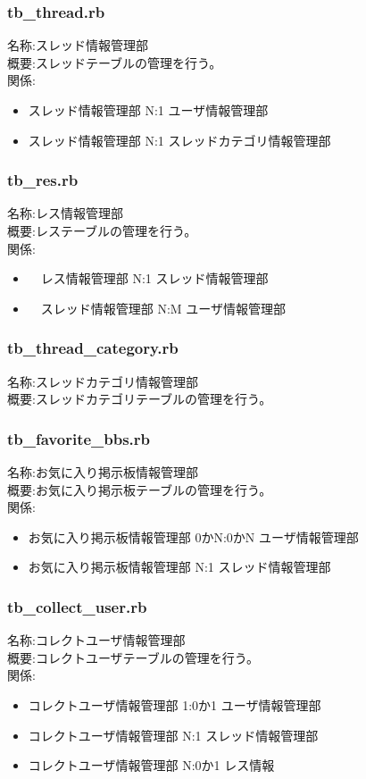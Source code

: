 \documentclass[a4j]{jarticle}
\begin{document}
\subsubsection{tb\_thread.rb}
  \noindent
  名称:スレッド情報管理部\\
  概要:スレッドテーブルの管理を行う。\\
  関係:
  \begin{itemize}
  \item スレッド情報管理部 N:1 ユーザ情報管理部
  \item スレッド情報管理部 N:1 スレッドカテゴリ情報管理部
  \end{itemize}

\subsubsection{tb\_res.rb}
  \noindent
  名称:レス情報管理部\\
  概要:レステーブルの管理を行う。\\
  関係:

  \begin{itemize}
  \item　レス情報管理部 N:1 スレッド情報管理部
  \item　スレッド情報管理部 N:M ユーザ情報管理部
  \end{itemize}

\subsubsection{tb\_thread\_category.rb}
  \noindent
  名称:スレッドカテゴリ情報管理部\\
  概要:スレッドカテゴリテーブルの管理を行う。\\

\subsubsection{tb\_favorite\_bbs.rb}
  \noindent
  名称:お気に入り掲示板情報管理部\\
  概要:お気に入り掲示板テーブルの管理を行う。\\
  関係:
  \begin{itemize}
  \item お気に入り掲示板情報管理部 0かN:0かN ユーザ情報管理部
  \item お気に入り掲示板情報管理部 N:1 スレッド情報管理部
  \end{itemize}

\subsubsection{tb\_collect\_user.rb}
  \noindent
  名称:コレクトユーザ情報管理部\\
  概要:コレクトユーザテーブルの管理を行う。\\
  関係:
  \begin{itemize}
  \item コレクトユーザ情報管理部 1:0か1 ユーザ情報管理部
  \item コレクトユーザ情報管理部 N:1 スレッド情報管理部
  \item コレクトユーザ情報管理部 N:0か1 レス情報
  \end{itemize}
\end{document}

